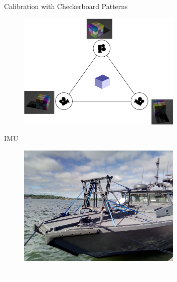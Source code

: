\documentclass{beamer}
\begin{document}
\begin{frame}{Calibration with Checkerboard Patterns}
  \begin{figure}
    \centering
    \includegraphics[width=0.7\textwidth]{problem/camera_graph}
  \end{figure}
\end{frame}


\begin{frame}{IMU}
  \begin{figure}
    \centering
    \includegraphics[width=0.7\textwidth]{problem/imu_rig}
  \end{figure}
\end{frame}


\bgroup
{}
\begin{frame}[t,plain]{}{}
  \begin{center}
    {\tiny \textcolor{white}{The End}}
  \end{center}
\end{frame}
\egroup
\end{document}
